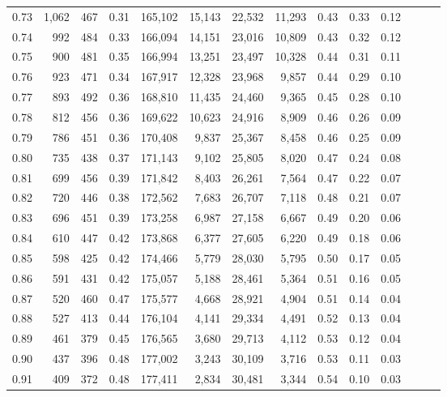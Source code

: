\begin{tabular}{rrrrrrrrrrrrrr}
0.73 &  1,062 &    467 &  0.31 &  165,102 &   15,143 &  22,532 &  11,293 &  0.43 &  0.33 &      0.12 \\
0.74 &    992 &    484 &  0.33 &  166,094 &   14,151 &  23,016 &  10,809 &  0.43 &  0.32 &      0.12 \\
0.75 &    900 &    481 &  0.35 &  166,994 &   13,251 &  23,497 &  10,328 &  0.44 &  0.31 &      0.11 \\
0.76 &    923 &    471 &  0.34 &  167,917 &   12,328 &  23,968 &   9,857 &  0.44 &  0.29 &      0.10 \\
0.77 &    893 &    492 &  0.36 &  168,810 &   11,435 &  24,460 &   9,365 &  0.45 &  0.28 &      0.10 \\
0.78 &    812 &    456 &  0.36 &  169,622 &   10,623 &  24,916 &   8,909 &  0.46 &  0.26 &      0.09 \\
0.79 &    786 &    451 &  0.36 &  170,408 &    9,837 &  25,367 &   8,458 &  0.46 &  0.25 &      0.09 \\
0.80 &    735 &    438 &  0.37 &  171,143 &    9,102 &  25,805 &   8,020 &  0.47 &  0.24 &      0.08 \\
0.81 &    699 &    456 &  0.39 &  171,842 &    8,403 &  26,261 &   7,564 &  0.47 &  0.22 &      0.07 \\
0.82 &    720 &    446 &  0.38 &  172,562 &    7,683 &  26,707 &   7,118 &  0.48 &  0.21 &      0.07 \\
0.83 &    696 &    451 &  0.39 &  173,258 &    6,987 &  27,158 &   6,667 &  0.49 &  0.20 &      0.06 \\
0.84 &    610 &    447 &  0.42 &  173,868 &    6,377 &  27,605 &   6,220 &  0.49 &  0.18 &      0.06 \\
0.85 &    598 &    425 &  0.42 &  174,466 &    5,779 &  28,030 &   5,795 &  0.50 &  0.17 &      0.05 \\
0.86 &    591 &    431 &  0.42 &  175,057 &    5,188 &  28,461 &   5,364 &  0.51 &  0.16 &      0.05 \\
0.87 &    520 &    460 &  0.47 &  175,577 &    4,668 &  28,921 &   4,904 &  0.51 &  0.14 &      0.04 \\
0.88 &    527 &    413 &  0.44 &  176,104 &    4,141 &  29,334 &   4,491 &  0.52 &  0.13 &      0.04 \\
0.89 &    461 &    379 &  0.45 &  176,565 &    3,680 &  29,713 &   4,112 &  0.53 &  0.12 &      0.04 \\
0.90 &    437 &    396 &  0.48 &  177,002 &    3,243 &  30,109 &   3,716 &  0.53 &  0.11 &      0.03 \\
0.91 &    409 &    372 &  0.48 &  177,411 &    2,834 &  30,481 &   3,344 &  0.54 &  0.10 &      0.03 \\

\end{tabular}
